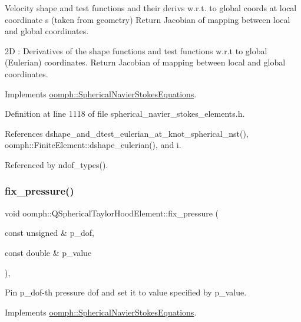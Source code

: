 Velocity shape and test functions and their derivs w.\+r.\+t. to global coords at local coordinate s (taken from geometry) Return Jacobian of mapping between local and global coordinates. 

2D \+: Derivatives of the shape functions and test functions w.\+r.\+t to global (Eulerian) coordinates. Return Jacobian of mapping between local and global coordinates. 

Implements \hyperlink{classoomph_1_1SphericalNavierStokesEquations_a3b9e9cf2d59dffcf278b4c9f73be6d62}{oomph\+::\+Spherical\+Navier\+Stokes\+Equations}.



Definition at line 1118 of file spherical\+\_\+navier\+\_\+stokes\+\_\+elements.\+h.



References dshape\+\_\+and\+\_\+dtest\+\_\+eulerian\+\_\+at\+\_\+knot\+\_\+spherical\+\_\+nst(), oomph\+::\+Finite\+Element\+::dshape\+\_\+eulerian(), and i.



Referenced by ndof\+\_\+types().

\mbox{\label{classoomph_1_1QSphericalTaylorHoodElement_acc320cd97d3adae63e1775f24f63efe7}} 
\subsubsection{\texorpdfstring{fix\+\_\+pressure()}{fix\_pressure()}}
{\footnotesize\ttfamily void oomph\+::\+Q\+Spherical\+Taylor\+Hood\+Element\+::fix\+\_\+pressure (\begin{DoxyParamCaption}\item[{const unsigned \&}]{p\+\_\+dof,  }\item[{const double \&}]{p\+\_\+value }\end{DoxyParamCaption})\hspace{0.3cm}{\ttfamily [inline]}, {\ttfamily [virtual]}}



Pin p\+\_\+dof-\/th pressure dof and set it to value specified by p\+\_\+value. 



Implements \hyperlink{classoomph_1_1SphericalNavierStokesEquations_ae4dc4c80f271ed2b31296f01862dc536}{oomph\+::\+Spherical\+Navier\+Stokes\+Equations}.



